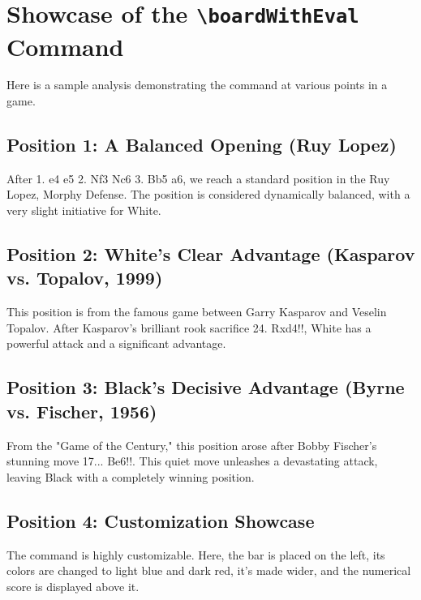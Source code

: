 \documentclass{article}
\begin{document}
\section*{Showcase of the \texttt{\textbackslash boardWithEval} Command}

Here is a sample analysis demonstrating the command at various points in a game.

\subsection*{Position 1: A Balanced Opening (Ruy Lopez)}
After 1. e4 e5 2. Nf3 Nc6 3. Bb5 a6, we reach a standard position in the Ruy Lopez, Morphy Defense. The position is considered dynamically balanced, with a very slight initiative for White.
\begin{center}
\end{center}

\subsection*{Position 2: White's Clear Advantage (Kasparov vs. Topalov, 1999)}
This position is from the famous game between Garry Kasparov and Veselin Topalov. After Kasparov's brilliant rook sacrifice 24. Rxd4!!, White has a powerful attack and a significant advantage.
\begin{center}
\end{center}

\subsection*{Position 3: Black's Decisive Advantage (Byrne vs. Fischer, 1956)}
From the "Game of the Century," this position arose after Bobby Fischer's stunning move 17... Be6!!. This quiet move unleashes a devastating attack, leaving Black with a completely winning position.
\begin{center}
\end{center}

\subsection*{Position 4: Customization Showcase}
The command is highly customizable. Here, the bar is placed on the left, its colors are changed to light blue and dark red, it's made wider, and the numerical score is displayed above it.
\begin{center}
\end{center}
\end{document}

